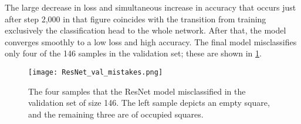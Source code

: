 \documentclass[../main.tex]{subfiles}
\begin{document}
The large decrease in loss and simultaneous increase in accuracy that occurs just after step 2,000 in that figure coincides with the transition from training exclusively the classification head to the whole network.
After that, the model converges smoothly to a low loss and high accuracy.
The final model misclassifies only four of the 146 samples in the validation set; these are shown in \cref{fig:occupancy_resnet_mistakes}.
\begin{figure}
    \texttt{[image: ResNet\_val\_mistakes.png]}
    \caption[The four samples that the ResNet model misclassified in the validation set.]{The four samples that the ResNet model misclassified in the validation set of size 146. The left sample depicts an empty square, and the remaining three are of occupied squares.}
    \label{fig:occupancy_resnet_mistakes}
\end{figure}
\end{document}
